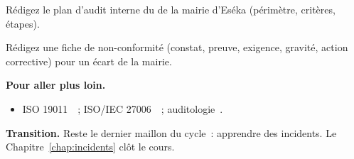 \begin{boxexo}[title={\ding{45}\quad Exercice~19.9. Plan d'audit \niveauexpert}]
Rédigez le plan d'audit interne du  de la mairie d'Eséka (périmètre,
critères, étapes).
\end{boxexo}

\begin{boxexo}[title={\ding{45}\quad Exercice~19.10. Fiche d'écart \niveauexpert}]
Rédigez une fiche de non-conformité (constat, preuve, exigence, gravité, action
corrective) pour un écart de la mairie.
\end{boxexo}

\bigskip

\begin{boxinfo}
\textbf{Pour aller plus loin.}
\begin{itemize}
    \item ISO 19011~\cite{iso19011}~; ISO/IEC 27006~\cite{iso27006}~;
          auditologie~\cite{minka2026auditologie}.
\end{itemize}
\end{boxinfo}

\begin{boxinfo}
\textbf{Transition.} Reste le dernier maillon du cycle~: apprendre des
incidents. Le Chapitre~\ref{chap:incidents} clôt le cours.
\end{boxinfo}
